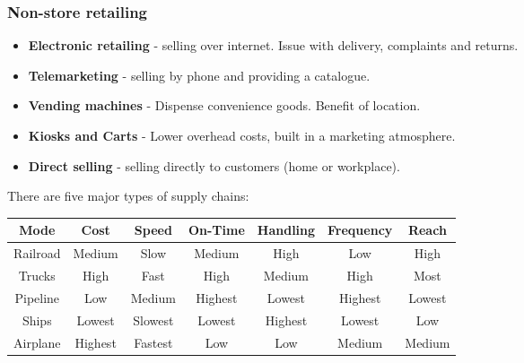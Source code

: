 \documentclass[english, 12pt]{article}
\begin{document}
\subsubsection*{Non-store retailing}
\begin{itemize}
\item \textbf{Electronic retailing} - selling over internet. Issue with delivery, complaints and returns.
\item \textbf{Telemarketing} - selling by phone and providing a catalogue.
\item \textbf{Vending machines} - Dispense convenience goods. Benefit of location.
\item \textbf{Kiosks and Carts} - Lower overhead costs, built in a marketing atmosphere.
\item \textbf{Direct selling}  - selling directly to customers (home or workplace).
\end{itemize}
There are five major types of supply chains:
\begin{center}
\begin{tabular}{|c|c|c|c|c|c|c|}
\hline
Mode & Cost & Speed & On-Time & Handling & Frequency & Reach\\
\hline
Railroad & Medium & Slow & Medium & High & Low & High\\
Trucks & High & Fast & High & Medium & High & Most\\
Pipeline & Low & Medium & Highest & Lowest & Highest & Lowest\\
Ships & Lowest & Slowest & Lowest & Highest & Lowest & Low\\
Airplane & Highest & Fastest & Low & Low & Medium & Medium\\
\hline
\end{tabular}
\end{center}
\end{document}
